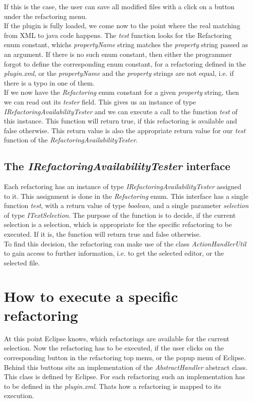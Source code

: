 \documentclass[a4paper,10pt]{report}
\begin{document}
If this is the case, the user can save all modified files with a click on a button under the refactoring menu. \\
If the plugin is fully loaded, we come now to the point where the real matching from XML to java code happens. The {\it test} function looks for the {Refactoring} enum constant, whichs {\it propertyName} string matches the {\it property} string passed as an argument.
If there is no such enum constant, then either the programmer forgot to define the corresponding enum constant, for a refactoring defined in the {\it plugin.xml}, or the {\it propertyName} and the {\it property} strings are not equal, i.e. if there is a typo in one of them.\\
If we now have the {\it Refactoring} enum constant for a given {\it property} string, then we can read out its {\it tester} field. This gives us an instance of type {\it IRefactoringAvailabilityTester} and we can execute a call to the function {\it test} of this instance.
This function will return true, if this refactoring is available and false otherwise. This return value is also the appropriate return value for our {\it test} function of the {\it RefactoringAvailabilityTester}.

\subsection{The {\it IRefactoringAvailabilityTester} interface}
Each refactoring has an instance of type {\it IRefactoringAvailabilityTester} assigned to it. This assignment is done in the {\it Refactoring} enum. This interface has a single function {\it test}, with a return value of type {\it boolean}, and a single parameter {\it selection} of type {\it ITextSelection}.
The purpose of the function is to decide, if the current selection is a selection, which is appropriate for the specific refactoring to be executed. If it is, the function will return true and false otherwise.\\
To find this decision, the refactoring can make use of the class {\it ActionHandlerUtil} to gain access to further information, i.e. to get the selected editor, or the selected file.\\


\section{How to execute a specific refactoring}
At this point Eclipse knows, which refactorings are available for the current selection. Now the refactoring has to be executed, if the user clicks on the corresponding button in the refactoring top menu, or the popup menu of Eclipse.
Behind this buttons sits an implementation of the {\it AbstractHandler} abstract class. This class is defined by Eclipse. For each refactoring such an implementation has to be defined in the {\it plugin.xml}. Thats how a refactoring is mapped to its execution.
\end{document}
